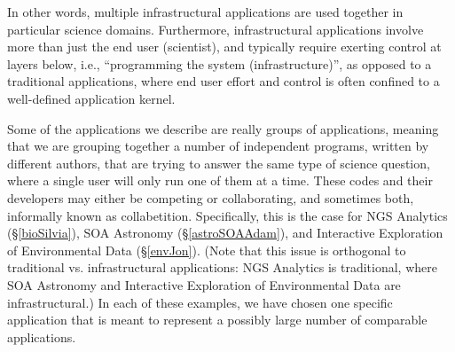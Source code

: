 In other words, multiple infrastructural applications are used together in particular
science domains.  Furthermore, infrastructural
applications involve more than just the end user (scientist), and
typically require exerting control at layers below, i.e.,
``programming the system (infrastructure)'', as opposed to a
traditional applications, where end user effort and control is often
confined to a well-defined application kernel.




Some of the applications we describe are really groups of
applications, meaning that we are grouping together a number of
independent programs, written by different authors, that are trying to
answer the same type of science question, where a single user
will only run one of them at a time.  %
These codes and their developers may either be
competing or collaborating, and sometimes both, informally known as
collabetition. Specifically, this is the case for NGS Analytics
(\S\ref{bioSilvia}), SOA Astronomy (\S\ref{astroSOAAdam}), and
Interactive Exploration of Environmental Data (\S\ref{envJon}).  (Note
that this issue is orthogonal to traditional vs. infrastructural applications:
NGS Analytics is traditional, where SOA Astronomy and Interactive
Exploration of Environmental Data are infrastructural.)  In
each of these examples, we have chosen one specific application that
is meant to represent a possibly large number of comparable
applications.

